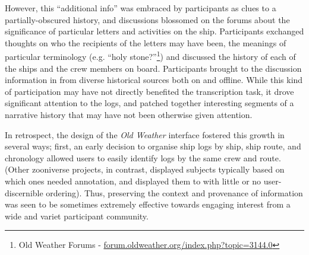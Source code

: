 \documentclass{sigchi}
\begin{document}
However, this ``additional info'' was embraced by participants as clues to a partially-obscured history, and discussions blossomed on the forums about the significance of particular letters and activities on the ship.  Participants exchanged thoughts on who the recipients of the letters may have been, the meanings of particular terminology (e.g. ``holy stone?''\footnote{Old Weather Forums - \url{forum.oldweather.org/index.php?topic=3144.0}}) and discussed the history of each of the ships and the crew members on board.  Participants brought to the discussion information in from diverse historical sources both on and offline.  While this kind of participation may have not directly benefited the transcription task, it drove significant attention to the logs, and patched together interesting segments of a narrative history that may have not been otherwise given attention.  %

In retrospect, the design of the \emph{Old Weather} interface fostered this growth in several ways; first, an early decision to organise ship logs by ship, ship route, and chronology allowed users to easily identify logs by the same crew and route. (Other zooniverse projects, in contrast, displayed subjects typically based on which ones needed annotation, and displayed them to with little or no user-discernible ordering). Thus, preserving the context and provenance of information was seen to be sometimes extremely effective towards engaging interest from a wide and variet participant community.

\end{document}
